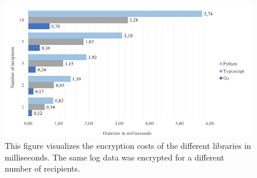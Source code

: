 \documentclass[../main.tex]{subfiles}
\begin{document}
\begin{figure}[ht]
    \includegraphics[scale=0.5]{../img/07/performance_tests.jpg}
    \centering
    \caption{This figure visualizes the encryption costs of the different libraries in milliseconds. The same log data was encrypted for a different number of recipients.}
    \label{fig:performance}
\end{figure}
\end{document}
